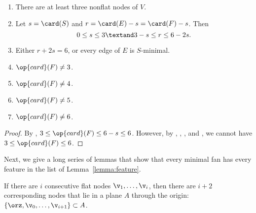 \begin{lemma}
\begin{enumerate}
\item {} There are at least three nonflat nodes of $V$.
\item {} %
Let      $s=\card(S)$ and $r=\card(E) - s = \card(F)-s$.  Then
\[ 0\le s \le 3\textand 3-s \le r \le 6 -
2s.\] 
\item {} Either $r+2s = 6$, or every edge of $E$ is $S$-minimal.
\item {} $\op{card}(F) \ne 3$.
\item {} $\op{card}(F) \ne 4$.
\item {} $\op{card}(F) \ne 5$.
\item {} $\op{card}(F) \ne 6$.
\end{enumerate}\wasitemize 
\end{lemma}

\begin{proof}
  By , $3\le\op{card}(F)\le 6-s\le 6$.  However, by
  , ,
  , and , we cannot have
  $3\le\op{card}(F)\le 6$.
\end{proof}





Next, we give a long series of lemmas that show that every minimal fan
has every feature in the list of Lemma~\ref{lemma:feature}.

If there are $i$ consecutive flat nodes $\v_1,\ldots,\v_i$, then there
are $i+2$ corresponding nodes that lie in a plane $A$ through the
origin: $\{\orz,\v_0,\ldots,\v_{i+1}\}\subset A$.

